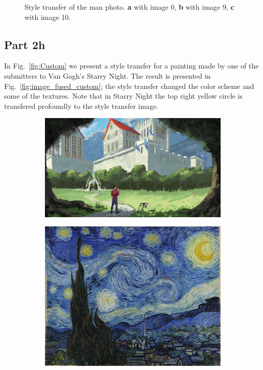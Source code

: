 \documentclass[a4paper]{iacas}
\begin{document}
\begin{figure}[!htbp]
	\caption{Style transfer of the man photo. \textbf{a} with image 0, \textbf{b} with image 9, \textbf{c} with image 10.}
	\label{fig:Man}
\end{figure}

\subsection{Part 2h}

In Fig.~\ref{fig:Custom} we present a style transfer for a painting made by one of the submitters to Van Gogh's Starry Night. The result is presented in Fig.~\ref{fig:image_fused_custom}; the style transfer changed the color scheme and some of the textures. Note that in Starry Night the top right yellow circle is transfered profoundly to the style transfer image.

\begin{figure}[!htbp]
	
	\begin{subfigure}[b]{0.48\textwidth}
		\includegraphics[width=\textwidth]{my_pic.jpg}
		\caption{}
		\label{fig:image_1_custom}
	\end{subfigure}
	\begin{subfigure}[b]{0.48\textwidth}
		\includegraphics[width=\textwidth]{starry_night.jpg}
		\caption{}
		\label{fig:image_2_custom}
	\end{subfigure}


\end{figure}
\end{document}
